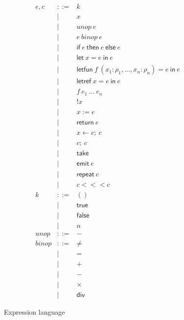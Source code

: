 \documentclass[twocolumn]{article}
\newcommand{\bnfdef}{::=}
\newcommand{\bnfalt}{\mathrel{\mid}}
\newcommand{\kw}[1]{\textsf{#1}}
\newcommand{\arr}{\mathrel{<\!\!<\!\!<}}
\begin{document}
\begin{figure}
\begin{equation*}
\begin{array}{lcl}
  e, c
     & \bnfdef & k \\
     & \bnfalt & x \\
     & \bnfalt & unop~ e \\
     & \bnfalt & e~ binop~ e \\
     & \bnfalt & \kw{if}~ e~ \kw{then}~ e~ \kw{else}~ e \\
     & \bnfalt & \kw{let}~ x \mathrel{=} e~ \kw{in}~ e \\
     & \bnfalt & \kw{letfun}~ f~ (x_1 : \rho_1, \ldots, x_n : \rho_n) \mathrel{=} e~ \kw{in}~ e \\
     & \bnfalt & \kw{letref}~ x \mathrel{=} e~ \kw{in}~ e \\
     & \bnfalt & f~ e_1~ \ldots~ e_n \\
     & \bnfalt & \kw{!} x \\
     & \bnfalt & x \mathrel{:=} e \\
     & \bnfalt & \kw{return}~ e \\
     & \bnfalt & x \mathrel{\leftarrow} c;~ c \\
     & \bnfalt & c;~ c \\
     & \bnfalt & \kw{take} \\
     & \bnfalt & \kw{emit}~ e \\
     & \bnfalt & \kw{repeat}~ c \\
     & \bnfalt & c \arr c \\
  k
     & \bnfdef & () \\
     & \bnfalt & \kw{true} \\
     & \bnfalt & \kw{false} \\
     & \bnfalt & n \\
  unop
     & \bnfdef & - \\
  binop
     & \bnfdef & \ne \\
     & \bnfalt & = \\
     & \bnfalt & + \\
     & \bnfalt & - \\
     & \bnfalt & \times \\
     & \bnfalt & \kw{div}
\end{array}
\end{equation*}
\caption{Expression language}
\label{fig:lang:exp}
\end{figure}
\end{document}
